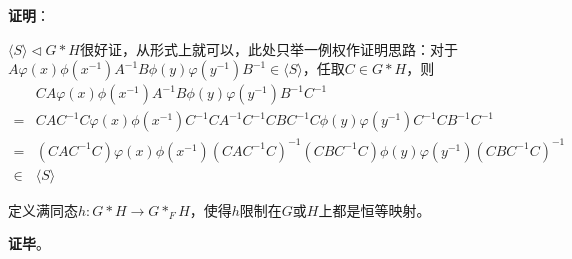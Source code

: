 \textbf{证明}：

$\langle S \rangle \lhd G*H$很好证，从形式上就可以，此处只举一例权作证明思路：对于$A\varphi(x)\phi(x^{-1})A^{-1}B\phi(y)\varphi(y^{-1})B^{-1}\in \langle S \rangle$，任取$C\in G*H$，则
\begin{equation}
\begin{aligned}
    &CA\varphi(x)\phi(x^{-1})A^{-1}B\phi(y)\varphi(y^{-1})B^{-1}C^{-1} \\
    ={}& 
    CAC^{-1}C\varphi(x)\phi(x^{-1})C^{-1}CA^{-1}C^{-1}CBC^{-1}C\phi(y)\varphi(y^{-1})C^{-1}CB^{-1}C^{-1}\\
    ={}& 
    (CAC^{-1}C)\varphi(x)\phi(x^{-1})(CAC^{-1}C)^{-1}(CBC^{-1}C)\phi(y)\varphi(y^{-1})(CBC^{-1}C)^{-1}\\
    \in{}& \langle S \rangle
\end{aligned}
\end{equation}

定义满同态$h:G*H\to G*_FH$，使得$h$限制在$G$或$H$上都是恒等映射。

\textbf{证毕}。



















